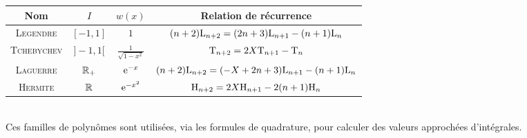 \newpage

\begin{figure*}
    \begin{tabular}{|c|c|c|c|}
        \hline
        Nom & $I$ & $w(x)$ & Relation de récurrence\\
        \hline \hline
        \textsc{Legendre} & $[-1, 1]$ & $1$ & $(n+2) \mathrm{L}_{n+2} = (2n+3) \mathrm{L}_{n+1} - (n+1)\mathrm{L}_n$\\
        \hline
        \textsc{Tchebychev} & $]-1, 1[$ & $\frac{1}{\sqrt{1-x^2}}$ & $\mathrm{T}_{n+2} = 2X \mathrm{T}_{n+1} - \mathrm{T}_n$ \\
        \hline
        \textsc{Laguerre} & $\mathbb{R}_+$ & $\mathrm{e}^{-x}$ & $(n+2) \mathrm{L}_{n+2} = (-X+2n+3) \mathrm{L}_{n+1} - (n+1) \mathrm{L}_n$ \\
        \hline
        \textsc{Hermite} & $\mathbb{R}$ & $\mathrm{e}^{-x^2}$ & $\mathrm{H}_{n+2} = 2X \mathrm{H}_{n+1} - 2(n+1) \mathrm{H}_n$\\
        \hline
    \end{tabular} \\
    Ces familles de polynômes sont utilisées, via les formules de quadrature, pour calculer des valeurs approchées d'intégrales.
\end{figure*}
